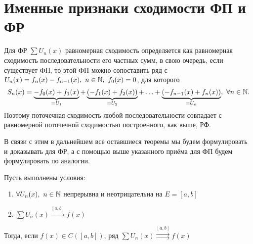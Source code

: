 \documentclass[../../main.tex]{subfiles}
\begin{document}
\section{Именные признаки сходимости ФП и ФР}

Для ФР $\sum U_n(x)$ равномерная сходимость определяется как 
равномерная сходимость последовательности его частных сумм, в свою очередь,
если существует ФП, то этой ФП можно сопоставить ряд с 
$U_n(x) = f_n(x) - f_{n-1}(x),\ n \in \mathbb{N},\ f_0(x) = 0$, для которого
\[
S_n(x) = \underbrace{-f_0(x) + f_1(x)}_{= U_1} + 
\underbrace{(-f_1(x) + f_2(x))}_{= U_2} + \ldots +
\underbrace{(-f_{n-1}(x) + f_n(x))}_{= U_n},\ \forall n \in \mathbb{N}.	
\]
Поэтому поточечная сходимость любой последовательности совпадает с 
равномерной поточечной сходимостью построенного, как выше, РФ.

В связи с этим в дальнейшем все оставшиеся теоремы мы будем формулировать
и доказывать для ФР, а с помощью выше указанного приёма для ФП будем
формулировать по аналогии.

\begin{thm}
Пусть выполнены условия:

	\begin{enumerate}
		\item $\forall U_n(x),\ n \in \mathbb{N}$ непрерывна и неотрицательна на
	$E=[a,b]$
		\item $\sum U_n(x) \overset{[a,b]}{\longrightarrow} f(x)$
	\end{enumerate}
Тогда, если $f(x) \in C([a,b])$, ряд 
$\sum U_n(x) \overset{[a,b]}{\rightrightarrows} f(x)$
\end{thm}	
\end{document}
